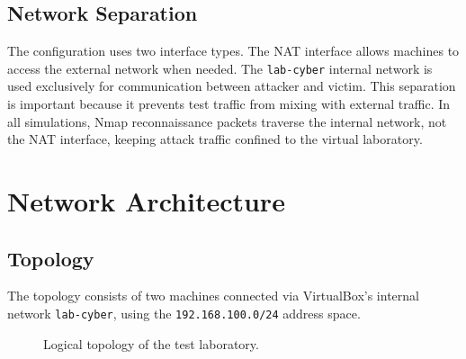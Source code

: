 \subsection{Network Separation}

The configuration uses two interface types. The NAT interface allows machines to access the external network when needed. The \texttt{lab-cyber} internal network is used exclusively for communication between attacker and victim. This separation is important because it prevents test traffic from mixing with external traffic. In all simulations, Nmap reconnaissance packets traverse the internal network, not the NAT interface, keeping attack traffic confined to the virtual laboratory.

\section{Network Architecture}

\subsection{Topology}

The topology consists of two machines connected via VirtualBox's internal network \texttt{lab-cyber}, using the \texttt{192.168.100.0/24} address space.

\begin{figure}[H]
\centering
{}
\caption{Logical topology of the test laboratory.}
\label{fig:topologie-logique}
\end{figure}

